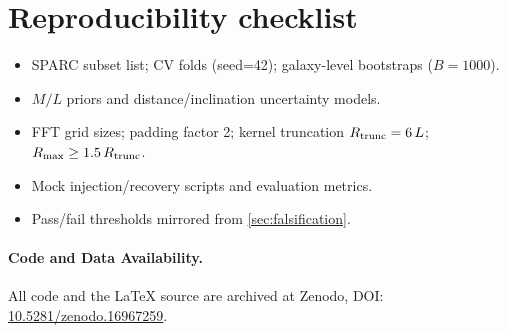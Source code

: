 		\section{Reproducibility checklist}\label{app:reprod}
		\begin{itemize}
			\item SPARC subset list; CV folds (seed=42); galaxy-level bootstraps ($B=1000$).
			\item $M/L$ priors and distance/inclination uncertainty models.
			\item FFT grid sizes; padding factor 2; kernel truncation $R_{\rm trunc}=6\,L$; $R_{\max}\ge 1.5\,R_{\rm trunc}$.
			\item Mock injection/recovery scripts and evaluation metrics.
			\item Pass/fail thresholds mirrored from \cref{sec:falsification}.
		\end{itemize}
		\paragraph{Code and Data Availability.}
  All code and the LaTeX source are archived at Zenodo, DOI: \href{https://doi.org/10.5281/zenodo.16967259}{10.5281/zenodo.16967259}.

		
		
		
	
